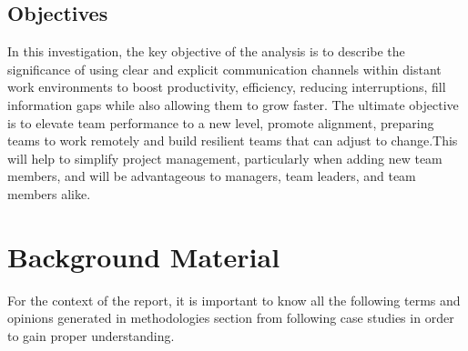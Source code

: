 \documentclass{llncs}
\begin{document}
\subsection{Objectives}
In this investigation, the key objective of the analysis is to describe the significance of using clear and explicit communication channels within distant work environments to boost productivity, efficiency, reducing interruptions, fill information gaps while also allowing them to grow faster. The ultimate objective is to elevate team performance to a new level, promote alignment, preparing teams to work remotely and build resilient teams that can adjust to change.This will help to simplify project management, particularly when adding new team members, and will be advantageous to managers, team leaders, and team members alike. ~\cite{refbook1} 

\section{Background Material}
For the context of the report, it is important to know all the following terms and opinions generated in methodologies section from following case studies in order to gain proper understanding.
\end{document}
